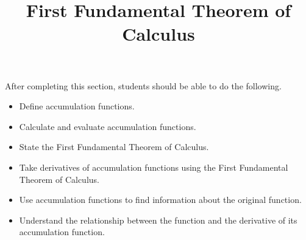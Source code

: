 \documentclass{ximera}
\title{First Fundamental Theorem of Calculus}
\begin{document}
\begin{abstract}
\end{abstract}

\maketitle

\begin{sectionOutcomes}

After completing this section, students should be able to do the following.

\begin{itemize}
	\item Define accumulation functions.
	\item Calculate and evaluate accumulation functions.
	\item State the First Fundamental Theorem of Calculus.
	\item Take derivatives of accumulation functions using the First Fundamental Theorem of Calculus.
	\item Use accumulation functions to find information about the original function.
	\item Understand the relationship between the function and the derivative of its accumulation function.
\end{itemize}

\end{sectionOutcomes}
\end{document}
